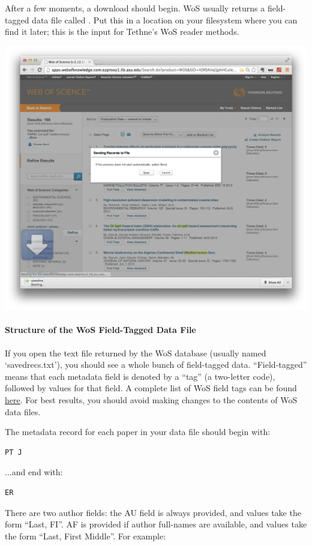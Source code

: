 \documentclass[letterpaper,10pt,english]{sphinxmanual}
\begin{document}
After a few moments, a download should begin. WoS usually returns a field-tagged
data file called . Put this in a location on your filesystem where
you can find it later; this is the input for Tethne's WoS reader methods.

\includegraphics[width=0.600\linewidth]{getting.4.png}


\paragraph{Structure of the WoS Field-Tagged Data File}
\label{tutorial.getting_data:structure-of-the-wos-field-tagged-data-file}\label{tutorial.getting_data:fieldtagged}
If you open the text file returned by the WoS database (usually named `savedrecs.txt'),
you should see a whole bunch of field-tagged data. ``Field-tagged'' means that each metadata
field is denoted by a ``tag'' (a two-letter code), followed by values for that field. A
complete list of WoS field tags can be found \href{http://images.webofknowledge.com/WOKRS53B4/help/WOS/hs\_wos\_fieldtags.html}{here}. For best results, you should avoid
making changes to the contents of WoS data files.

The metadata record for each paper in your data file should begin with:

\begin{Verbatim}[commandchars=\\\{\}]
PT J
\end{Verbatim}

...and end with:

\begin{Verbatim}[commandchars=\\\{\}]
ER
\end{Verbatim}

There are two author fields: the AU field is always provided, and values take the form
``Last, FI''. AF is provided if author full-names are available, and values take the form
``Last, First Middle''. For example:
\end{document}
